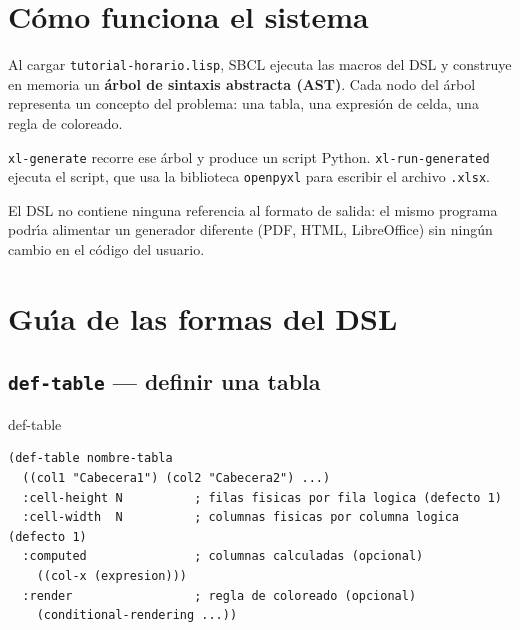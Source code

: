 \documentclass[12pt,a4paper]{report}
\begin{document}

\section{C\'omo funciona el sistema}
\label{sec:conceptos}

Al cargar \texttt{tutorial-horario.lisp}, SBCL ejecuta las macros del DSL
y construye en memoria un \textbf{\'arbol de sintaxis abstracta (AST)}.
Cada nodo del \'arbol representa un concepto del problema: una tabla, una
expresi\'on de celda, una regla de coloreado.

\texttt{xl-generate} recorre ese \'arbol y produce un script Python.
\texttt{xl-run-generated} ejecuta el script, que usa la biblioteca
\texttt{openpyxl} para escribir el archivo \texttt{.xlsx}.

El DSL no contiene ninguna referencia al formato de salida: el mismo programa
podr\'{\i}a alimentar un generador diferente (PDF, HTML, LibreOffice) sin
ning\'un cambio en el c\'odigo del usuario.

\section{Gu\'{\i}a de las formas del DSL}
\label{sec:guia}

\subsection{\texttt{def-table} --- definir una tabla}

\begin{sintaxisbox}{def-table}
\begin{lstlisting}
(def-table nombre-tabla
  ((col1 "Cabecera1") (col2 "Cabecera2") ...)
  :cell-height N          ; filas fisicas por fila logica (defecto 1)
  :cell-width  N          ; columnas fisicas por columna logica (defecto 1)
  :computed               ; columnas calculadas (opcional)
    ((col-x (expresion)))
  :render                 ; regla de coloreado (opcional)
    (conditional-rendering ...))
\end{lstlisting}
\end{sintaxisbox}
\end{document}

